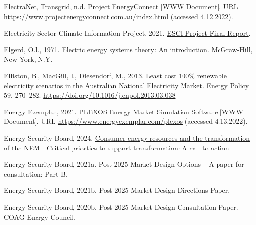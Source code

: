 \documentclass[12pt,a4paper,]{report}
\newlength{\cslhangindent}
\newenvironment{CSLReferences}[2] %
 {%
  \setlength{\parindent}{0pt}
  \ifodd #1 \everypar{\setlength{\hangindent}{\cslhangindent}}\ignorespaces\fi
  \ifnum #2 > 0
  \setlength{\parskip}{#2\baselineskip}
  \fi
 }%
 {}
\begin{document}
\begin{CSLReferences}{1}{0}
\leavevmode{}%
ElectraNet, Transgrid, n.d. Project {EnergyConnect} {[}WWW Document{]}.
URL \url{https://www.projectenergyconnect.com.au/index.html} (accessed
4.12.2022).

\leavevmode{}%
Electricity Sector Climate Information Project, 2021.
\href{https://www.climatechangeinaustralia.gov.au/media/ccia/2.2/cms_page_media/799/ESCI\%20Project\%20final\%20report_210721.pdf}{{ESCI
Project Final Report}}.

\leavevmode{}%
Elgerd, O.I., 1971. Electric energy systems theory: An introduction.
McGraw-Hill, New York, N.Y.

\leavevmode{}%
Elliston, B., MacGill, I., Diesendorf, M., 2013. Least cost 100\%
renewable electricity scenarios in the {Australian National Electricity
Market}. Energy Policy 59, 270--282.
\url{https://doi.org/10.1016/j.enpol.2013.03.038}

\leavevmode{}%
Energy Exemplar, 2021. {PLEXOS} \textbar{} {Energy Market Simulation
Software} {[}WWW Document{]}. URL
\url{https://www.energyexemplar.com/plexos} (accessed 4.13.2022).

\leavevmode{}%
Energy Security Board, 2024.
\href{https://www.energy.gov.au/sites/default/files/2024-02/ESB\%20report\%20-\%20CONSUMER\%20ENERGY\%20RESOURCES\%20AND\%20THE\%20TRANSFORMATION\%20OF\%20THE\%20NEM.pdf}{Consumer
energy resources and the transformation of the {NEM} - {Critical}
priorties to support transformation: A call to action}.

\leavevmode{}%
Energy Security Board, 2021a. Post 2025 {Market Design Options} -- {A}
paper for consultation: {Part B}.

\leavevmode{}%
Energy Security Board, 2021b. Post-2025 {Market Design Directions
Paper}.

\leavevmode{}%
Energy Security Board, 2020b. Post 2025 {Market Design Consultation
Paper}. COAG Energy Council.


\end{CSLReferences}
\end{document}
